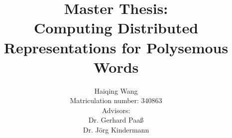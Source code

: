 \documentclass[12pt,a4paper,twoside]{book}
\begin{document}
\title{Master Thesis:\\ Computing Distributed Representations for Polysemous Words}
\author{Haiqing Wang \\Matriculation number: 340863 \\ Advisors:  \\ Dr. Gerhard Paaß \\ Dr. Jörg Kindermann \\ }
\maketitle

\setlength{\parindent}{2em}

\iffalse
\begingroup
  \pagenumbering{roman}
  

\newpage

\thispagestyle{empty}

\rule{0cm}{5cm}

\newpage

\thispagestyle{empty}






\newpage

\endgroup


\pagestyle{fancy}

\renewcommand{\sectionmark}[1]{\markright{\thesection\ #1}}
\renewcommand{\chaptermark}[1]{\markboth{\thechapter\ #1}{}}
\lhead[\rm\thepage]{\sl\rightmark}
\chead{}
\rhead[\sl\leftmark]{\rm\thepage}

\lfoot{}
\cfoot{}
\rfoot{}


\tableofcontents


\fi



\tableofcontents

\listoftables
\listoffigures













%


\end{document}
